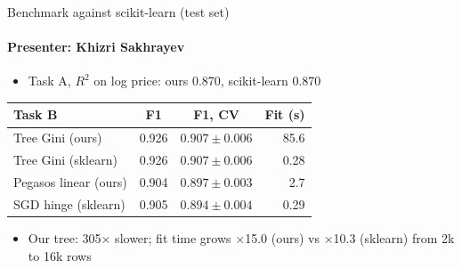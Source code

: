 \documentclass[14pt,aspectratio=169]{beamer}
\newcommand{\presenter}[1]{\framesubtitle{Presenter: #1}}
\newcommand{\gap}{\setlength{\itemsep}{0.45em}}
\begin{document}
\begin{frame}{Benchmark against scikit-learn (test set)}
  \presenter{Khizri Sakhrayev}
  \begin{itemize}\gap
    \item Task A, $R^2$ on log price: ours 0.870, %
      scikit-learn 0.870 %
  \end{itemize}
  \vspace{0.3em}
  \centering
  \begin{tabular}{@{}lccr@{}}
    \toprule
    Task B & F1 & F1, CV & Fit (s) \\
    \midrule
    Tree Gini (ours)    & 0.926 & $0.907 \pm 0.006$ & 85.6 \\ %
    Tree Gini (sklearn) & 0.926 & $0.907 \pm 0.006$ & 0.28 \\ %
    Pegasos linear (ours) & 0.904 & $0.897 \pm 0.003$ & 2.7 \\ %
    SGD hinge (sklearn) & 0.905 & $0.894 \pm 0.004$ & 0.29 \\ %
    \bottomrule
  \end{tabular}
  \raggedright
  \begin{itemize}\gap
    \item Our tree: 305$\times$ slower; fit time grows $\times$15.0 (ours) %
      vs $\times$10.3 (sklearn) from 2k to 16k rows %
  \end{itemize}
\end{frame}
\end{document}
